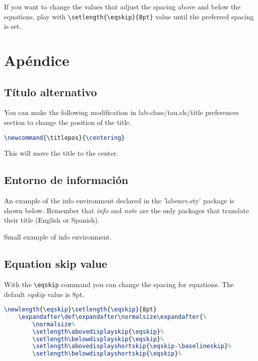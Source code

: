     If you want to change the values that adjust the spacing above and below the equations, play with \verb|\setlength{\eqskip}{8pt}| value until the preferred spacing is set.
	

\section*{Apéndice}

    \subsection*{Título alternativo}

        You can make the following modification in lab-class/tau.cls/title preferences section to change the position of the title.

\begin{lstlisting}[language=TeX, caption=Alternative title.]
\newcommand{\titlepos}{\centering}
\end{lstlisting}

        This will move the title to the center. 

    \subsection*{Entorno de información}

        An example of the info environment declared in the 'labenvs.sty' package is shown below. Remember that \textit{info} and \textit{note} are the only packages that translate their title (English or Spanish).
		
	\begin{info}
		Small example of info environment.
	\end{info}

    \subsection{Equation skip value}

        With the \verb|\eqskip| command you can change the spacing for equations. The default \textit{eqskip} value is 8pt.

\begin{lstlisting}[language=TeX, caption=Equation skip code.]
\newlength{\eqskip}\setlength{\eqskip}{8pt}
	\expandafter\def\expandafter\normalsize\expandafter{%
		\normalsize%
		\setlength\abovedisplayskip{\eqskip}%
		\setlength\belowdisplayskip{\eqskip}%
		\setlength\abovedisplayshortskip{\eqskip-\baselineskip}%
		\setlength\belowdisplayshortskip{\eqskip}%
\end{lstlisting}
